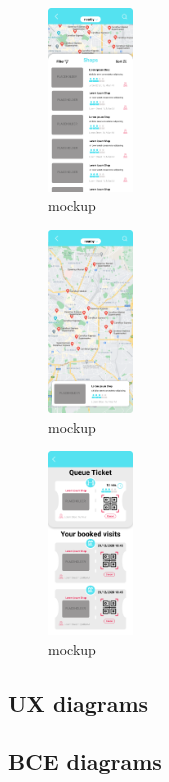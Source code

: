 \begin{figure}[h!]
    \centering
    \includegraphics[width=0.2\textwidth]{mockups/ShopsPage 1 .png}
    \caption{\label{fig:mockup}mockup}
\end{figure}

\begin{figure}[h!]
    \centering
    \includegraphics[width=0.2\textwidth]{mockups/ShopsPage 2 .png}
    \caption{\label{fig:mockup}mockup}
\end{figure}

\begin{figure}[h!]
    \centering
    \includegraphics[width=0.2\textwidth]{mockups/YourTicketPage.png}
    \caption{\label{fig:mockup}mockup}
\end{figure}

\FloatBarrier

\subsection{UX diagrams}
\label{subsect:userexpirience}

\subsection{BCE diagrams}
\label{subsect:BCEdiagrams}